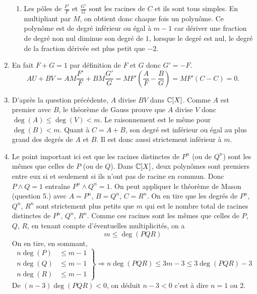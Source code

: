 \begin{enumerate}
\begin{enumerate}
 \item Les pôles de $\frac{F'}{F}$ et $\frac{G'}{G}$ sont les racines de $C$ et ils sont tous simples. En multipliant par $M$, on obtient donc chaque fois un polynôme. Ce polynôme est de degré inférieur ou égal à $m-1$ car dériver une fraction de degré non nul diminue son degré de $1$, lorsque le degré est nul, le degré de la fraction dérivée est plus petit que $-2$.
\end{enumerate}
 
 \item En fait $F+G=1$ par définition de $F$ et $G$ donc $G' = -F$.
\begin{displaymath}
 AU+BV = AM\frac{F'}{F}+BM\frac{G'}{G} = MF'\left( \frac{A}{F}-\frac{B}{G}\right) =MF'(C-C)=0   .
\end{displaymath}
  
 \item D'après la question précédente, $A$ divise $BV$ dans $\mathbb{C}[X]$. Comme $A$ est premier avec $B$, le théorème de Gauss prouve que $A$ divise $V$ donc $\deg(A)\leq \deg(V)<m$. Le raisonnement est le même pour $\deg(B)<m$. Quant à $C=A+B$, son degré est inférieur ou égal au plus grand des degrés de $A$ et $B$. Il est donc aussi strictement inférieur à $m$.
 
 \item Le point important ici est que les racines distinctes de $P^n$ (ou de $Q^n$) sont les mêmes que celles de $P$ (ou de $Q$).\newline
Dans $\mathbb{C}[X]$, deux polynômes sont premiers entre eux si et seulement si ils n'ont pas de racine en commun. Donc $P\wedge Q = 1$ entraîne $P^n\wedge Q^n = 1$. On peut appliquer le théorème de Mason (question 5.) avec $A=P^n$, $B=Q^n$, $C=R^n$. On en tire que les degrés de $P^n$, $Q^n$, $R^n$ sont strictement plus petits que $m$ qui est le nombre total de racines distinctes de $P^n$, $Q^n$, $R^n$. Comme ces racines sont les mêmes que celles de $P$, $Q$, $R$, en tenant compte d'éventuelles multiplicités, on a 
\begin{displaymath}
 m \leq \deg(PQR)
\end{displaymath}
On en tire, en sommant,
\begin{displaymath}
 \left. 
\begin{aligned}
 n\deg(P) &\leq m-1 \\ n\deg(Q) &\leq m-1 \\ n\deg(R) &\leq m-1 
\end{aligned}
\right\rbrace \Rightarrow
n \deg(PQR) \leq 3m -3 \leq 3\deg(PQR) -3
\end{displaymath}
De $(n-3)\deg(PQR) <0$, on déduit $n-3<0$ c'est à dire $n=1$ ou $2$.
\end{enumerate}
